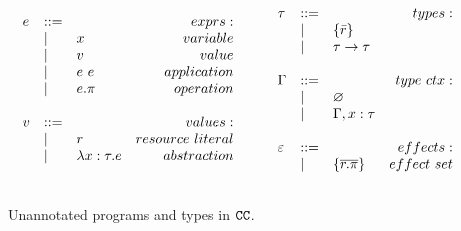 \begin{figure}

\vspace{-0.6cm}
\[
\begin{array}{lll}

\begin{array}{lllr}
e & ::= & ~ & exprs: \\
	& | & x & variable \\
	& | & v & value \\
	& | & e ~ e & application \\
	& | & e.\pi & operation \\
	&&\\

v & ::= & ~ & values: \\
	& | & r & resource~literal \\
	& | & \lambda x: \tau.e & abstraction \\
	&&\\
\end{array}

\hspace{5ex}

\begin{array}{lllr}

\tau & ::= & ~ & types: \\
		& | & \{ \bar r \} \\
		& | & \tau \rightarrow \tau \\ 
		&&\\

\Gamma & ::= & ~ & type~ctx: \\
				& | & \varnothing \\
				& | & \Gamma, x: \tau \\
				&&\\
				
\varepsilon & ::= & ~ & effects: \\
		& | & \{ \overline{r.\pi} \} & effect~set \\
		&&\\

				
\end{array}

\end{array}
\]
\vspace{-0.6cm}
\caption{Unannotated programs and types in $\mathtt{CC}$.}
\vspace{-0.6cm}
\label{fig:epscalc_unannotated_grammar}
\end{figure}

